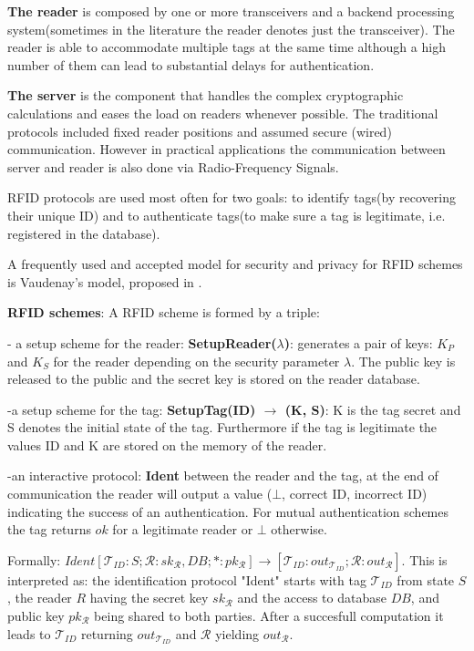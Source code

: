         \textbf{The reader} is composed by one or more transceivers and a backend processing system(sometimes in the literature the reader denotes just the transceiver). 
    The reader is able to accommodate multiple tags at the same time although a high number of them can lead to substantial delays for authentication. 
    
        \textbf{The server} is the component that handles the complex cryptographic calculations and eases the load on readers whenever possible. The traditional protocols
    included fixed reader positions and assumed secure (wired) communication. However in practical applications the communication between server and reader is also done via 
    Radio-Frequency Signals.

        RFID protocols are used most often for two goals: to identify tags(by recovering their unique ID) and to authenticate tags(to make sure a tag is legitimate, i.e. registered in 
    the database). 

        A frequently used and accepted model for security and privacy for RFID schemes is Vaudenay's
    model, proposed in \cite{Vaudenay}. 

    \textbf{RFID schemes}: A RFID scheme is formed by a triple:

    - a setup scheme for the reader: \textbf{SetupReader($\lambda$)}: generates a pair of keys: $K_P$ and 
    $K_S$ for the reader depending on the security parameter $\lambda$. The public key is released
    to the public and the secret key is stored on the reader database.

    -a setup scheme for the tag: \textbf{SetupTag(ID) $\rightarrow$ (K, S)}: K is the tag secret and S denotes the 
    initial state of the tag. Furthermore if the tag is legitimate the values ID and K are stored
    on the memory of the reader.
    
    -an interactive protocol: \textbf{Ident} between the reader and the tag, at the end of communication the reader
    will output a value ($\bot$, correct ID, incorrect ID) indicating the success of an authentication. For mutual authentication
    schemes the tag returns $ok$ for a legitimate reader or $\bot$ otherwise. 
    
    Formally: $Ident[\mathcal{T}_{ID}:S; \mathcal{R}: sk_{\mathcal{R}}, DB; *:pk_{\mathcal{R}}] \rightarrow 
    [\mathcal{T}_{ID}:out_{\mathcal{T}_{ID}}; \mathcal{R}:out_{\mathcal{R}}]$. This is interpreted as:
    the identification protocol "Ident" starts with tag $\mathcal{T}_{ID}$ from state $S$, the reader $R$ having the secret key 
    $sk_{\mathcal{R}}$ and the access to database $DB$, and public key $pk_{\mathcal{R}}$ being shared to both parties. After a 
    succesfull computation it leads to $\mathcal{T}_{ID}$ returning $out_{\mathcal{T}_{ID}}$ and $\mathcal{R}$ yielding $out_{\mathcal{R}}$.

